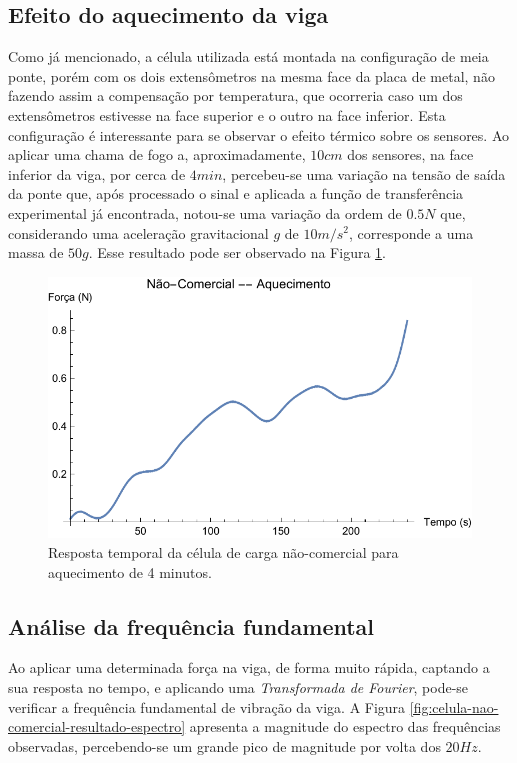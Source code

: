 \documentclass[a4paper]{instrumentacao}
\begin{document}
\subsection{Efeito do aquecimento da viga}

Como já mencionado, a célula utilizada está montada na configuração de meia ponte, porém com os dois extensômetros na mesma face da placa de metal, não fazendo assim a compensação por temperatura, que ocorreria caso um dos extensômetros estivesse na face superior e o outro na face inferior. Esta configuração é interessante para se observar o efeito térmico sobre os sensores. Ao aplicar uma chama de fogo a, aproximadamente, $10cm$ dos sensores, na face inferior da viga, por cerca de $4min$, percebeu-se uma variação na tensão de saída da ponte que, após processado o sinal e aplicada a função de transferência experimental já encontrada, notou-se uma variação da ordem de $0.5N$ que, considerando uma aceleração gravitacional $g$ de $10m/s^2$, corresponde a uma massa de $50g$. Esse resultado pode ser observado na Figura \ref{fig:celula-nao-comercial-resultado-aquecimento}.

\begin{figure}[H]
\center
\includegraphics[width=\textwidth]{NaoComercial-Aquecimento.pdf}
\caption{Resposta temporal da célula de carga não-comercial para aquecimento de 4 minutos.}
\label{fig:celula-nao-comercial-resultado-aquecimento}
\end{figure}

\subsection{Análise da frequência fundamental}

Ao aplicar uma determinada força na viga, de forma muito rápida, captando a sua resposta no tempo, e aplicando uma \textit{Transformada de Fourier}, pode-se verificar a frequência fundamental de vibração da viga. A Figura \ref{fig:celula-nao-comercial-resultado-espectro} apresenta a magnitude do espectro das frequências observadas, percebendo-se um grande pico de magnitude por volta dos $20Hz$.
\end{document}
